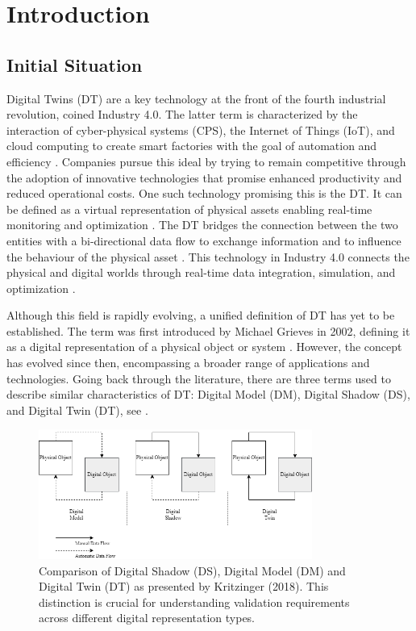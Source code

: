 \chapter{Introduction}
\label{chap:introduction}

\section{Initial Situation}
Digital Twins (DT) are a key technology at the front of the fourth industrial revolution, coined Industry 4.0.
The latter term is characterized by the interaction of cyber-physical systems (CPS), the Internet of Things (IoT), and cloud computing to create smart factories with the goal of automation and efficiency \parencite{Oztemel2020}. Companies pursue this ideal by trying to remain competitive through the adoption of innovative technologies that promise enhanced productivity and reduced operational costs. One such technology promising this is the DT. It can be defined as a virtual representation of physical assets enabling real-time monitoring and optimization \parencite{Tao2018ijamt}. The DT bridges the connection between the two entities with a bi-directional data flow to exchange information and to influence the behaviour of the physical asset \parencite{grieves2014digital}. This technology in Industry 4.0 connects the physical and digital worlds through real-time data integration, simulation, and optimization \parencite{judijanto2024trends}.

Although this field is rapidly evolving, a unified definition of DT has yet to be established. The term was first introduced by Michael Grieves in 2002, defining it as a digital representation of a physical object or system \parencite{grieves2014digital}. However, the concept has evolved since then, encompassing a broader range of applications and technologies. Going back through the literature, there are three terms used to describe similar characteristics of DT: Digital Model (DM), Digital Shadow (DS), and Digital Twin (DT), see  \parencite{jones2020characterising,Zhang2021jmsy}.

\begin{figure}[htbp]
  \centering
  \includegraphics[width=0.8\textwidth]{figures/kritzinger.png}
  \caption{Comparison of Digital Shadow (DS), Digital Model (DM) and Digital Twin (DT) as presented by Kritzinger (2018). This distinction is crucial for understanding validation requirements across different digital representation types.}
  \label{fig:Kritzinger}
\end{figure}

